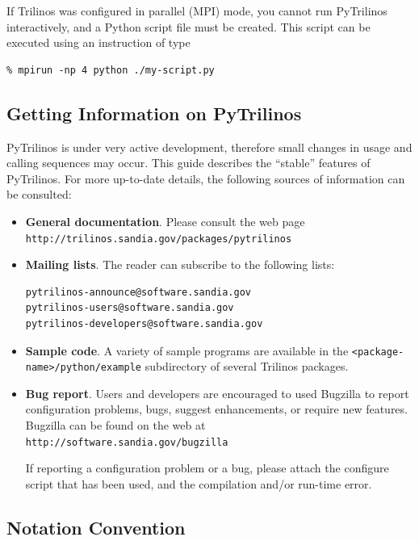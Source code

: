 \documentclass[10pt,relax]{SANDreport}
\newcommand{\PyTrilinos}{{PyTrilinos}}
\begin{document}
If Trilinos was configured in parallel (MPI) mode, you cannot run PyTrilinos
interactively, and a Python script file must be created. This script can be
executed using an instruction of type
\begin{verbatim}
% mpirun -np 4 python ./my-script.py
\end{verbatim}

\subsection{Getting Information on \PyTrilinos}

PyTrilinos is under very active development, therefore small changes in usage
and calling sequences may occur. This
guide describes the ``stable'' features of PyTrilinos. For more up-to-date
details, the following sources of information can be consulted:
\begin{itemize}
\item {\bf General documentation}.
Please consult the web page \\
  \verb!http://trilinos.sandia.gov/packages/pytrilinos!
\item {\bf Mailing lists}. The reader can subscribe to the following lists:
\begin{verbatim}
pytrilinos-announce@software.sandia.gov
pytrilinos-users@software.sandia.gov
pytrilinos-developers@software.sandia.gov
\end{verbatim}
\item {\bf Sample code}. A variety of sample programs are available in the
\verb!<package-name>/python/example! subdirectory of several Trilinos
packages.
\item {\bf Bug report}.
Users and developers are encouraged to used Bugzilla to report
configuration problems, bugs, suggest enhancements, or require new features.
Bugzilla can be found on the web at\\
  \verb!http://software.sandia.gov/bugzilla!

If reporting a configuration problem or a bug, please attach the configure
script that has been used, and the compilation and/or run-time error.
\end{itemize}

\subsection{Notation Convention}
\end{document}
